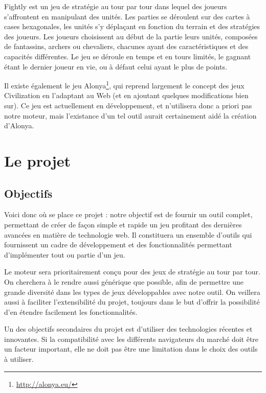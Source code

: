 \documentclass[a4paper,10pt]{report}
\begin{document}
      Fightly est un jeu de stratégie au tour par tour dans lequel des joueurs s'affrontent en manipulant des unités. Les parties se déroulent sur des cartes à cases hexagonales, les unités s'y déplaçant en fonction du terrain et des stratégies des joueurs. Les joueurs choisissent au début de la partie leurs unités, composées de fantassins, archers ou chevaliers, chacunes ayant des caractéristiques et des capacités différentes. Le jeu se déroule en temps et en tours limités, le gagnant étant le dernier joueur en vie, ou à défaut celui ayant le plus de points. 
      
      Il existe également le jeu Alonya\footnote{\url{http://alonya.eu/}}, qui reprend largement le concept des jeux Civilization en l'adaptant au Web (et en ajoutant quelques modifications bien sur). Ce jeu est actuellement en développement, et n'utilisera donc a priori pas notre moteur, mais l'existance d'un tel outil aurait certainement aidé la création d'Alonya. 



  \chapter{Le projet}

    \section{Objectifs}

      Voici donc où se place ce projet : notre objectif est de fournir un outil complet, permettant de créer de façon simple et rapide un jeu profitant des dernières avancées en matière de technologie web. Il constituera un ensemble d'outils qui fournissent un cadre de développement et des fonctionnalités permettant d'implémenter tout ou partie d'un jeu.

      Le moteur sera prioritairement conçu pour des jeux de stratégie au tour par tour. On cherchera à le rendre aussi générique que possible, afin de permettre une grande diversité dans les types de jeux développables avec notre outil. On veillera aussi à faciliter l'extensibilité du projet, toujours dans le but d'offrir la possibilité d'en étendre facilement les fonctionnalités.

      Un des objectifs secondaires du projet est d'utiliser des technologies récentes et innovantes. Si la compatibilité avec les différents navigateurs du marché doit être un facteur important, elle ne doit pas être une limitation dans le choix des outils à utiliser. 
\end{document}
